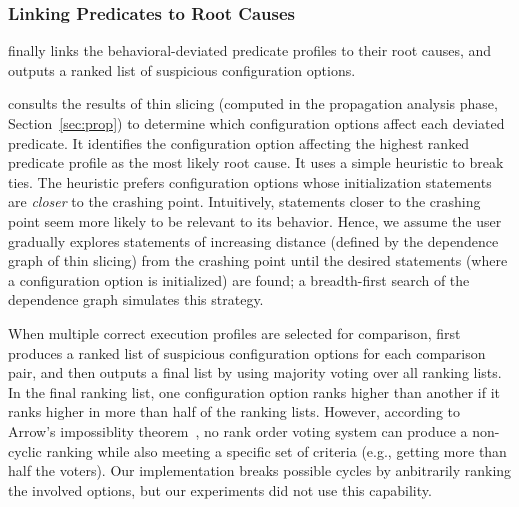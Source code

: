 

\subsubsection{Linking Predicates to Root Causes}
\label{sec:linking}


\ourtool finally links the behavioral-deviated
predicate profiles to their root causes, and outputs a ranked list of suspicious
configuration options.

\ourtool consults the results of thin slicing (computed in the propagation
analysis phase, Section~\ref{sec:prop}) to determine which
configuration options affect each deviated predicate.
It identifies the configuration option
affecting the highest ranked predicate profile as the most likely
root cause.  It uses a simple heuristic to break ties.
The heuristic prefers configuration options whose initialization
statements are \textit{closer} to the
crashing point. Intuitively, statements closer to the
crashing point seem more likely to be relevant to its behavior.
Hence, we assume the user gradually explores statements of
increasing distance (defined by the dependence graph of thin slicing)
from the crashing point until the desired statements (where a configuration
option is initialized) are found; a breadth-first
search of the dependence graph simulates this strategy.


When multiple correct execution profiles are selected for comparison,
\ourtool first produces a ranked list of suspicious
configuration options for each comparison pair, and then outputs
a final list by using majority voting over all ranking lists.
In the final ranking list, one configuration option ranks higher
than another if it ranks higher in more than half of the ranking lists.
However, according to Arrow's impossiblity theorem~\cite{Fishburn1970103},
no rank order voting system can produce a non-cyclic ranking while also
meeting a specific set of criteria (e.g., getting more than half the voters).
Our implementation breaks possible cycles by anbitrarily ranking the
involved options, but our experiments did not use this capability.



